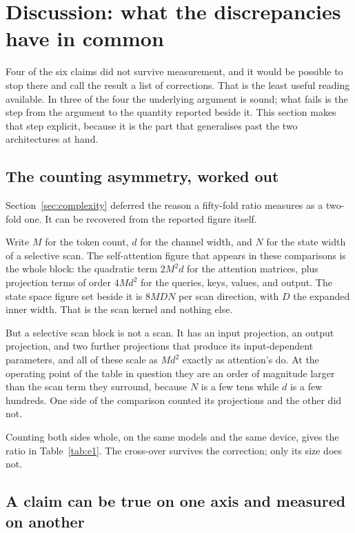 \section{Discussion: what the discrepancies have in common}
\label{sec:discussion}

Four of the six claims did not survive measurement, and it would be possible
to stop there and call the result a list of corrections. That is the least
useful reading available. In three of the four the underlying argument is
sound; what fails is the step from the argument to the quantity reported
beside it. This section makes that step explicit, because it is the part that
generalises past the two architectures at hand.

\subsection{The counting asymmetry, worked out}

Section~\ref{sec:complexity} deferred the reason a fifty-fold ratio measures
as a two-fold one. It can be recovered from the reported figure itself.

Write $M$ for the token count, $d$ for the channel width, and $N$ for the
state width of a selective scan. The self-attention figure that appears in
these comparisons is the whole block: the quadratic term $2M^2d$ for the
attention matrices, plus projection terms of order $4Md^2$ for the queries,
keys, values, and output. The state space figure set beside it is $8MDN$ per
scan direction, with $D$ the expanded inner width. That is the scan kernel
and nothing else.

But a selective scan block is not a scan. It has an input projection, an
output projection, and two further projections that produce its
input-dependent parameters, and all of these scale as $Md^2$ exactly as
attention's do. At the operating point of the table in question they are an
order of magnitude larger than the scan term they surround, because $N$ is a
few tens while $d$ is a few hundreds. One side of the comparison counted its
projections and the other did not.

Counting both sides whole, on the same models and the same device, gives the
ratio in Table~\ref{tab:e1}. The cross-over survives the correction; only its
size does not.

\subsection{A claim can be true on one axis and measured on another}

